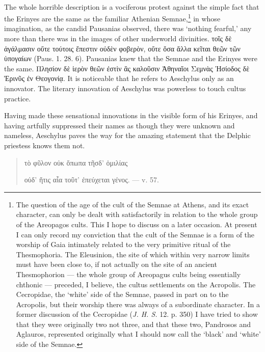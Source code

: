 \documentclass[a4paper, 11pt, oneside, polutonikogreek, english]{article}
\begin{document}
\paragraph{}
The whole horrible description is a vociferous protest against the simple fact that the Erinyes are the same as the familiar Athenian Semnae,\footnote{The question of the age of the cult of the Semnae at Athens, and its exact character, can only be dealt with satisfactorily in relation to the whole group of the Areopagos cults. This I hope to discuss on a later occasion. At present I can only record my conviction that the cult of the Semnae is a form of the worship of Gaia intimately related to the very primitive ritual of the Thesmophoria. The Eleusinion, the site of which within very narrow limits must have been close to, if not actually on the site of an ancient Thesmophorion --- the whole group of Areopagus cults being essentially chthonic --- preceded, I believe, the cultus settlements on the Acropolis. The Cecropidae, the `white' side of the Semnae, passed in part on to the Acropolis, but their worship there was always of a subordinate character. In a former discussion of the Cecropidae (\emph{J. H. S.} 12. p. 350) I have tried to show that they were originally two not three, and that these two, Pandrosos and Aglauros, represented originally what I should now call the `black' and `white' side of the Semnae.} in whose imagination, as the candid Pausanias observed, there was `nothing fearful,' any more than there was in the images of other underworld divinities. τοῖς δὲ ἀγάλμασιν οὔτε τούτοις ἔπεστιν οὐδὲν φοβερὸν, οὔτε ὅσα ἄλλα κεῖται θεῶν τῶν ὑπογαίων (Paus. 1. 28. 6). Pausanias knew that the Semnae and the Erinyes were the same. Πλησίον δὲ ἱερὸν θεῶν ἐστὶν ἃς καλοῦσιν Ἀθηναῖοι Σεμνὰς Ἠσίοδος δὲ Ἐρινῦς ἐν Θεογονίᾳ. It is noticeable that he refers to Aeschylus only as an innovator. The literary innovation of Aeschylus was powerless to touch cultus practice.

Having made these sensational innovations in the visible form of his Erinyes, and having artfully suppressed their names as though they were unknown and nameless, Aeschylus paves the way for the amazing statement that the Delphic priestess knows them not.
\begin{quotation}
τὸ φῦλον οὐκ ὅπωπα τῆσδ' ὁμιλίας

οὐδ' ἥτις αἷα τοῦτ' ἐπεύχεται γένος. --- v. 57.
\end{quotation}
\end{document}
